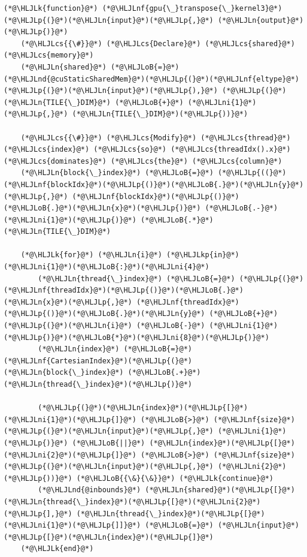 \documentclass[12pt,a4paper]{article}
\newcommand{\HLJLk}[1]{\textcolor[RGB]{148,91,176}{\textbf{#1}}}
\newcommand{\HLJLkp}[1]{\textcolor[RGB]{148,91,176}{\textbf{#1}}}
\newcommand{\HLJLn}[1]{#1}
\newcommand{\HLJLnd}[1]{\textcolor[RGB]{214,102,97}{#1}}
\newcommand{\HLJLnf}[1]{\textcolor[RGB]{66,102,213}{#1}}
\newcommand{\HLJLni}[1]{\textcolor[RGB]{59,151,46}{#1}}
\newcommand{\HLJLoB}[1]{\textcolor[RGB]{102,102,102}{\textbf{#1}}}
\newcommand{\HLJLp}[1]{#1}
\newcommand{\HLJLcs}[1]{\textcolor[RGB]{153,153,119}{\textit{#1}}}
\begin{document}
\begin{lstlisting}
(*@\HLJLk{function}@*) (*@\HLJLnf{gpu{\_}transpose{\_}kernel3}@*)(*@\HLJLp{(}@*)(*@\HLJLn{input}@*)(*@\HLJLp{,}@*) (*@\HLJLn{output}@*)(*@\HLJLp{)}@*)
    (*@\HLJLcs{{\#}}@*) (*@\HLJLcs{Declare}@*) (*@\HLJLcs{shared}@*) (*@\HLJLcs{memory}@*)
    (*@\HLJLn{shared}@*) (*@\HLJLoB{=}@*) (*@\HLJLnd{@cuStaticSharedMem}@*)(*@\HLJLp{(}@*)(*@\HLJLnf{eltype}@*)(*@\HLJLp{(}@*)(*@\HLJLn{input}@*)(*@\HLJLp{),}@*) (*@\HLJLp{(}@*)(*@\HLJLn{TILE{\_}DIM}@*) (*@\HLJLoB{+}@*) (*@\HLJLni{1}@*)(*@\HLJLp{,}@*) (*@\HLJLn{TILE{\_}DIM}@*)(*@\HLJLp{))}@*)
    
    (*@\HLJLcs{{\#}}@*) (*@\HLJLcs{Modify}@*) (*@\HLJLcs{thread}@*) (*@\HLJLcs{index}@*) (*@\HLJLcs{so}@*) (*@\HLJLcs{threadIdx().x}@*) (*@\HLJLcs{dominates}@*) (*@\HLJLcs{the}@*) (*@\HLJLcs{column}@*)
    (*@\HLJLn{block{\_}index}@*) (*@\HLJLoB{=}@*) (*@\HLJLp{((}@*)(*@\HLJLnf{blockIdx}@*)(*@\HLJLp{()}@*)(*@\HLJLoB{.}@*)(*@\HLJLn{y}@*)(*@\HLJLp{,}@*) (*@\HLJLnf{blockIdx}@*)(*@\HLJLp{()}@*)(*@\HLJLoB{.}@*)(*@\HLJLn{x}@*)(*@\HLJLp{)}@*) (*@\HLJLoB{.-}@*) (*@\HLJLni{1}@*)(*@\HLJLp{)}@*) (*@\HLJLoB{.*}@*) (*@\HLJLn{TILE{\_}DIM}@*)
    
    (*@\HLJLk{for}@*) (*@\HLJLn{i}@*) (*@\HLJLkp{in}@*) (*@\HLJLni{1}@*)(*@\HLJLoB{:}@*)(*@\HLJLni{4}@*)
        (*@\HLJLn{thread{\_}index}@*) (*@\HLJLoB{=}@*) (*@\HLJLp{(}@*)(*@\HLJLnf{threadIdx}@*)(*@\HLJLp{()}@*)(*@\HLJLoB{.}@*)(*@\HLJLn{x}@*)(*@\HLJLp{,}@*) (*@\HLJLnf{threadIdx}@*)(*@\HLJLp{()}@*)(*@\HLJLoB{.}@*)(*@\HLJLn{y}@*) (*@\HLJLoB{+}@*) (*@\HLJLp{(}@*)(*@\HLJLn{i}@*) (*@\HLJLoB{-}@*) (*@\HLJLni{1}@*)(*@\HLJLp{)}@*)(*@\HLJLoB{*}@*)(*@\HLJLni{8}@*)(*@\HLJLp{)}@*)
        (*@\HLJLn{index}@*) (*@\HLJLoB{=}@*) (*@\HLJLnf{CartesianIndex}@*)(*@\HLJLp{(}@*)(*@\HLJLn{block{\_}index}@*) (*@\HLJLoB{.+}@*) (*@\HLJLn{thread{\_}index}@*)(*@\HLJLp{)}@*)

        (*@\HLJLp{(}@*)(*@\HLJLn{index}@*)(*@\HLJLp{[}@*)(*@\HLJLni{1}@*)(*@\HLJLp{]}@*) (*@\HLJLoB{>}@*) (*@\HLJLnf{size}@*)(*@\HLJLp{(}@*)(*@\HLJLn{input}@*)(*@\HLJLp{,}@*) (*@\HLJLni{1}@*)(*@\HLJLp{)}@*) (*@\HLJLoB{||}@*) (*@\HLJLn{index}@*)(*@\HLJLp{[}@*)(*@\HLJLni{2}@*)(*@\HLJLp{]}@*) (*@\HLJLoB{>}@*) (*@\HLJLnf{size}@*)(*@\HLJLp{(}@*)(*@\HLJLn{input}@*)(*@\HLJLp{,}@*) (*@\HLJLni{2}@*)(*@\HLJLp{))}@*) (*@\HLJLoB{{\&}{\&}}@*) (*@\HLJLk{continue}@*)
        (*@\HLJLnd{@inbounds}@*) (*@\HLJLn{shared}@*)(*@\HLJLp{[}@*)(*@\HLJLn{thread{\_}index}@*)(*@\HLJLp{[}@*)(*@\HLJLni{2}@*)(*@\HLJLp{],}@*) (*@\HLJLn{thread{\_}index}@*)(*@\HLJLp{[}@*)(*@\HLJLni{1}@*)(*@\HLJLp{]]}@*) (*@\HLJLoB{=}@*) (*@\HLJLn{input}@*)(*@\HLJLp{[}@*)(*@\HLJLn{index}@*)(*@\HLJLp{]}@*)
    (*@\HLJLk{end}@*)
    

\end{lstlisting}
\end{document}
